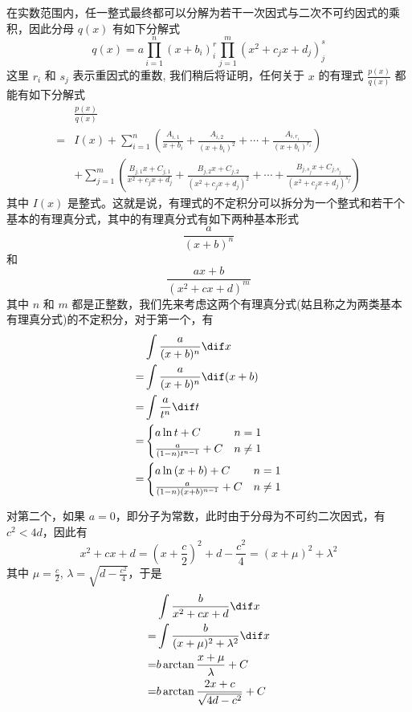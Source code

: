 在实数范围内，任一整式最终都可以分解为若干一次因式与二次不可约因式的乘积，因此分母 $q(x)$ 有如下分解式
\[ q(x) = a \prod_{i=1}^n(x+b_i)^r_i \prod_{j=1}^m(x^2+c_j x + d_j)^s_j \]
这里 $r_i$ 和 $s_j$ 表示重因式的重数, 我们稍后将证明，任何关于 $x$ 的有理式 $ \frac{p(x)}{q(x)} $ 都能有如下分解式
\begin{align*}
 & \frac{p(x)}{q(x)} \\
 = & I(x) + \sum_{i=1}^{n} \left( \frac{A_{i,1}}{x+b_i} + \frac{A_{i,2}}{(x+b_i)^2} + \cdots + \frac{A_{i,r_i}}{(x+b_i)^{r_i}}  \right) \\
 & + \sum_{j=1}^m \left( \frac{B_{j,1}x+C_{j,1}}{x^2+c_j x + d_j} + \frac{B_{j,2}x+C_{j,2}}{(x^2+c_j x + d_j)^2} + \cdots + \frac{B_{j,s_j}x+C_{j,s_j}}{(x^2+c_j x + d_j)^{s_j}} \right)
\end{align*}
其中 $I(x)$ 是整式。这就是说，有理式的不定积分可以拆分为一个整式和若干个基本的有理真分式，其中的有理真分式有如下两种基本形式
\[ \frac{a}{(x+b)^n} \]
和
\[ \frac{ax+b}{(x^2+cx+d)^m}  \]
其中 $n$ 和 $m$ 都是正整数，我们先来考虑这两个有理真分式(姑且称之为两类基本有理真分式)的不定积分，对于第一个，有
\begin{align*}
 & \int \frac{a}{(x+b)^n} \dif x \\
 = & \int \frac{a}{(x+b)^n}  \dif (x+b) \\
 = &\int \frac{a}{t^n} \dif t \\
 = & 
 \begin{cases}
    a\ln{t} + C & n=1 \\
    \frac{a}{(1-n)t^{n-1}} + C & n \neq 1
 \end{cases} \\
 = &
  \begin{cases}
    a\ln{(x+b)} + C & n=1 \\
    \frac{a}{(1-n)(x+b)^{n-1}} + C & n \neq 1
 \end{cases} \\
\end{align*}

对第二个，如果 $a=0$，即分子为常数，此时由于分母为不可约二次因式，有$c^2<4d$，因此有
\[ x^2+cx+d=\left(x+\frac{c}{2}\right)^2+d-\frac{c^2}{4} = (x+\mu)^2+\lambda^2 \]
其中 $\mu = \frac{c}{2}$, $\lambda = \sqrt{d-\frac{c^2}{4}}$，于是
\begin{align*}
 &  \int \frac{b}{x^2+cx+d} \dif x \\
  = & \int \frac{b}{(x+\mu)^2+\lambda^2} \dif x \\
  = & b \arctan{\frac{x+\mu}{\lambda}} + C \\
  = & b \arctan{\frac{2x+c}{\sqrt{4d-c^2}}} + C
\end{align*}

